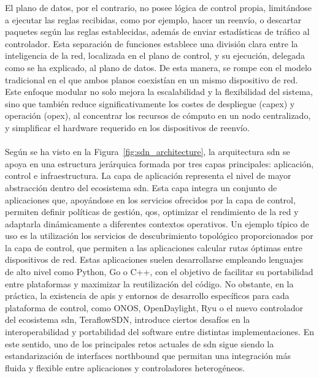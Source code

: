 El plano de datos, por el contrario, no posee lógica de control propia, limitándose a ejecutar las reglas recibidas, como por ejemplo, hacer un reenvío, o descartar paquetes según las reglas establecidas, además de  enviar estadísticas de tráfico al controlador. Esta separación de funciones establece una división clara entre la inteligencia de la red, localizada en el plano de control, y su ejecución, delegada como se ha explicado, al plano de datos. De esta manera, se rompe con el modelo tradicional en el que ambos planos coexistían en un mismo dispositivo de red. Este enfoque modular no solo mejora la escalabilidad y la flexibilidad del sistema, sino que también reduce significativamente los costes de despliegue (\gls{capex}) y operación (\gls{opex}), al concentrar los recursos de cómputo en un nodo centralizado, y simplificar el hardware requerido en los dispositivos de reenvío.\\
\\
Según se ha visto en la Figura~\ref{fig:sdn_architecture}, la arquitectura \gls{sdn} se apoya en una estructura jerárquica formada por tres capas principales: aplicación, control e infraestructura. La capa de aplicación representa el nivel de mayor abstracción dentro del ecosistema \gls{sdn}. Esta capa integra un conjunto de aplicaciones que, apoyándose en los servicios ofrecidos por la capa de control, permiten definir políticas de gestión, \gls{qos}, optimizar el rendimiento de la red y adaptarla dinámicamente a diferentes contextos operativos. Un ejemplo típico de uso es la utilización los servicios de descubrimiento topológico proporcionados por la capa de control, que permiten a las aplicaciones calcular rutas óptimas entre dispositivos de red. Estas aplicaciones suelen desarrollarse empleando lenguajes de alto nivel como Python, Go o C++, con el objetivo de facilitar su portabilidad entre plataformas y maximizar la reutilización del código. No obstante, en la práctica, la existencia de \glspl{api} y entornos de desarrollo específicos para cada plataforma de control, como ONOS, OpenDaylight, Ryu o el nuevo controlador del ecosistema \gls{sdn}, TeraflowSDN, introduce ciertos desafíos en la interoperabilidad y portabilidad del software entre distintas implementaciones. En este sentido, uno de los principales retos actuales de \gls{sdn} sigue siendo la estandarización de interfaces northbound que permitan una integración más fluida y flexible entre aplicaciones y controladores heterogéneos.\\
\\
